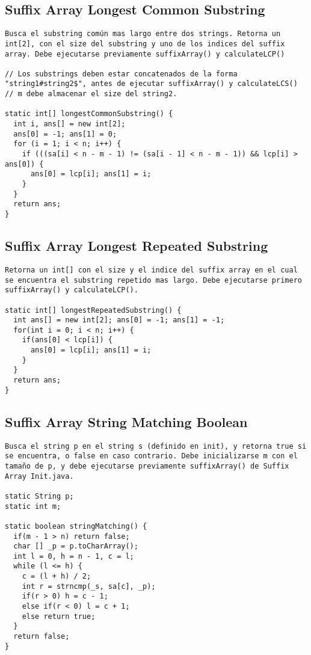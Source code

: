 \documentclass[10pt,letterpaper,twocolumn,twosided]{article}
\begin{document}
\subsection{Suffix Array Longest Common Substring}
\begin{lstlisting}
Busca el substring común mas largo entre dos strings. Retorna un int[2], con el size del substring y uno de los indices del suffix array. Debe ejecutarse previamente suffixArray() y calculateLCP()

// Los substrings deben estar concatenados de la forma "string1#string2$", antes de ejecutar suffixArray() y calculateLCS()
// m debe almacenar el size del string2.

static int[] longestCommonSubstring() {
  int i, ans[] = new int[2]; 
  ans[0] = -1; ans[1] = 0;
  for (i = 1; i < n; i++) {
    if (((sa[i] < n - m - 1) != (sa[i - 1] < n - m - 1)) && lcp[i] > ans[0]) { 
      ans[0] = lcp[i]; ans[1] = i;
    }
  }
  return ans;
}\end{lstlisting}

\subsection{Suffix Array Longest Repeated Substring}
\begin{lstlisting}
Retorna un int[] con el size y el indice del suffix array en el cual se encuentra el substring repetido mas largo. Debe ejecutarse primero suffixArray() y calculateLCP().

static int[] longestRepeatedSubstring() {
  int ans[] = new int[2]; ans[0] = -1; ans[1] = -1;
  for(int i = 0; i < n; i++) {
    if(ans[0] < lcp[i]) {
      ans[0] = lcp[i]; ans[1] = i;
    }
  }
  return ans;
}\end{lstlisting}

\subsection{Suffix Array String Matching Boolean}
\begin{lstlisting}
Busca el string p en el string s (definido en init), y retorna true si se encuentra, o false en caso contrario. Debe inicializarse m con el tamaño de p, y debe ejecutarse previamente suffixArray() de Suffix Array Init.java.

static String p;
static int m;

static boolean stringMatching() {
  if(m - 1 > n) return false;
  char [] _p = p.toCharArray();
  int l = 0, h = n - 1, c = l;
  while (l <= h) {
    c = (l + h) / 2;
    int r = strncmp(_s, sa[c], _p);
    if(r > 0) h = c - 1;
    else if(r < 0) l = c + 1;
    else return true;
  }
  return false;
}\end{lstlisting}
\end{document}
